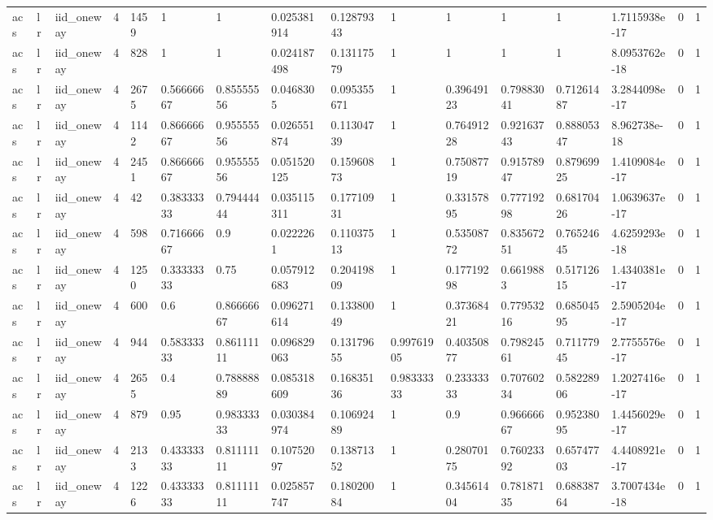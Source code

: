 \begin{tabular}{llllllllllllllll}
acs & lr & iid\_oneway & 4 & 1459 & 1 & 1 & 0.025381914 & 0.12879343 & 1 & 1 & 1 & 1 & 1.7115938e-17 & 0 & 1 \\
acs & lr & iid\_oneway & 4 & 828 & 1 & 1 & 0.024187498 & 0.13117579 & 1 & 1 & 1 & 1 & 8.0953762e-18 & 0 & 1 \\
acs & lr & iid\_oneway & 4 & 2675 & 0.56666667 & 0.85555556 & 0.0468305 & 0.095355671 & 1 & 0.39649123 & 0.79883041 & 0.71261487 & 3.2844098e-17 & 0 & 1 \\
acs & lr & iid\_oneway & 4 & 1142 & 0.86666667 & 0.95555556 & 0.026551874 & 0.11304739 & 1 & 0.76491228 & 0.92163743 & 0.88805347 & 8.962738e-18 & 0 & 1 \\
acs & lr & iid\_oneway & 4 & 2451 & 0.86666667 & 0.95555556 & 0.051520125 & 0.15960873 & 1 & 0.75087719 & 0.91578947 & 0.87969925 & 1.4109084e-17 & 0 & 1 \\
acs & lr & iid\_oneway & 4 & 42 & 0.38333333 & 0.79444444 & 0.035115311 & 0.17710931 & 1 & 0.33157895 & 0.77719298 & 0.68170426 & 1.0639637e-17 & 0 & 1 \\
acs & lr & iid\_oneway & 4 & 598 & 0.71666667 & 0.9 & 0.0222261 & 0.11037513 & 1 & 0.53508772 & 0.83567251 & 0.76524645 & 4.6259293e-18 & 0 & 1 \\
acs & lr & iid\_oneway & 4 & 1250 & 0.33333333 & 0.75 & 0.057912683 & 0.20419809 & 1 & 0.17719298 & 0.6619883 & 0.51712615 & 1.4340381e-17 & 0 & 1 \\
acs & lr & iid\_oneway & 4 & 600 & 0.6 & 0.86666667 & 0.096271614 & 0.13380049 & 1 & 0.37368421 & 0.77953216 & 0.68504595 & 2.5905204e-17 & 0 & 1 \\
acs & lr & iid\_oneway & 4 & 944 & 0.58333333 & 0.86111111 & 0.096829063 & 0.13179655 & 0.99761905 & 0.40350877 & 0.79824561 & 0.71177945 & 2.7755576e-17 & 0 & 1 \\
acs & lr & iid\_oneway & 4 & 2655 & 0.4 & 0.78888889 & 0.085318609 & 0.16835136 & 0.98333333 & 0.23333333 & 0.70760234 & 0.58228906 & 1.2027416e-17 & 0 & 1 \\
acs & lr & iid\_oneway & 4 & 879 & 0.95 & 0.98333333 & 0.030384974 & 0.10692489 & 1 & 0.9 & 0.96666667 & 0.95238095 & 1.4456029e-17 & 0 & 1 \\
acs & lr & iid\_oneway & 4 & 2133 & 0.43333333 & 0.81111111 & 0.10752097 & 0.13871352 & 1 & 0.28070175 & 0.76023392 & 0.65747703 & 4.4408921e-17 & 0 & 1 \\
acs & lr & iid\_oneway & 4 & 1226 & 0.43333333 & 0.81111111 & 0.025857747 & 0.18020084 & 1 & 0.34561404 & 0.78187135 & 0.68838764 & 3.7007434e-18 & 0 & 1 \\

\end{tabular}
